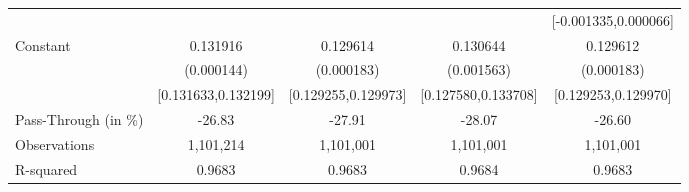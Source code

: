 {\begin{tabular}{l*{4}{c}}
                    &                     &                     &                     &[-0.001335,0.000066]         \\
Constant            &    0.131916\sym{***}&    0.129614\sym{***}&    0.130644\sym{***}&    0.129612\sym{***}\\
                    &  (0.000144)         &  (0.000183)         &  (0.001563)         &  (0.000183)         \\
                    &[0.131633,0.132199]         &[0.129255,0.129973]         &[0.127580,0.133708]         &[0.129253,0.129970]         \\
\midrule
Pass-Through (in \%)&      -26.83         &      -27.91         &      -28.07         &      -26.60         \\
Observations        &   1,101,214         &   1,101,001         &   1,101,001         &   1,101,001         \\
R-squared           &      0.9683         &      0.9683         &      0.9684         &      0.9683         \\
\bottomrule
\end{tabular}
}
